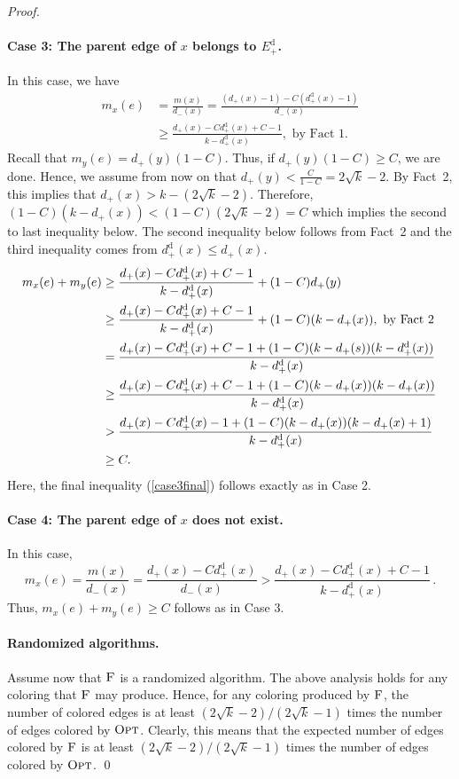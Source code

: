 \documentclass[smallextended]{svjour3}
\newcommand{\ed}{\ensuremath{E_{+}^{\text{d}}}\xspace}
\def\dc{d_{+}}
\def\dd{d_{+}^{\text{d}}}
\def\dr{d_{-}}
\newcommand{\OPT}{\ensuremath{\operatorname{\textsc{Opt}}}\xspace}
\newcommand{\FAIR}{\ensuremath{\operatorname{\textsc{F}}}\xspace}
\begin{document}
\begin{proof}
\paragraph{Case 3: The parent edge of $x$ belongs to $\ed$.} 
In this case, we have 
 \begin{align*}
 m_x(e) & = \frac{m(x)}{\dr(x)} = \frac{(\dc (x)-1)-C(\dd(x)-1)}{\dr(x)}\\
        & \geq \frac{\dc (x)-C\dd(x)+C-1}{k-\dd(x)}, \text{ by  Fact 1.}
\end{align*}
Recall that $m_y(e) = \dc(y)(1-C)$. Thus, if $\dc(y)(1-C)\geq C$, we are done. Hence, we assume from now on that $\dc(y)<\frac{C}{1-C}=2\sqrt{k}-2$. By Fact~2, this implies that $\dc(x)> k-(2\sqrt{k}-2)$.
Therefore, $(1-C)(k-\dc(x))< (1-C)(2\sqrt{k}-2)=C$ which implies the second to last inequality below. The second inequality below follows from Fact~2 and the third inequality comes from $\dd(x)\leq \dc(x)$.
\begin{align}
\notag m_x(e)+m_y(e)
 &\geq\frac{\dc (x)-C\dd(x)+C-1}{k-\dd(x)}+ (1-C)\dc(y)\\
\notag &\geq\frac{\dc (x)-C\dd(x)+C-1}{k-\dd(x)}+ (1-C)(k-\dc(x)), \text{ by Fact 2 }\\
\notag &= \frac{\dc (x)-C\dd(x)+C-1 + (1-C)(k-\dc(s))(k-\dd(x))}{k-\dd(x)}\\
\notag &\geq \frac{\dc (x)-C\dd(x)+C-1 + (1-C)(k-\dc(x))(k-\dc(x))}{k-\dd(x)}\\
\notag &> \frac{\dc(x)-C\dd(x)-1 + (1-C)(k-\dc(x))(k-\dc(x)+1)}{k-\dd(x)}\\
\label{case3final} &\geq C.
\end{align}
Here, 
the final inequality (\ref{case3final}) follows exactly as in Case 2.

\paragraph{Case 4: The parent edge of $x$ does not exist.} 
In this case,
 $$m_x(e) = \frac{m(x)}{\dr(x)} = \frac{\dc(x)-C\dd(x)}{\dr(x)} > \frac{\dc (x)-C\dd(x)+C-1}{k-\dd(x)}\,.$$
Thus, $m_x(e)+m_y(e)\geq C$ follows as in Case 3.

\paragraph{Randomized algorithms.}
Assume now that \FAIR is a randomized algorithm.
The above analysis holds for any coloring that \FAIR may produce.
Hence, for any coloring produced by \FAIR, the number of colored edges
 is at least $(2\sqrt{k}-2)/(2\sqrt{k}-1)$ times the number of edges
 colored by \OPT.
Clearly, this means that the expected number of edges colored by \FAIR
 is at least  $(2\sqrt{k}-2)/(2\sqrt{k}-1)$ times the number of edges
 colored by \OPT.
\qed\end{proof}
\end{document}
